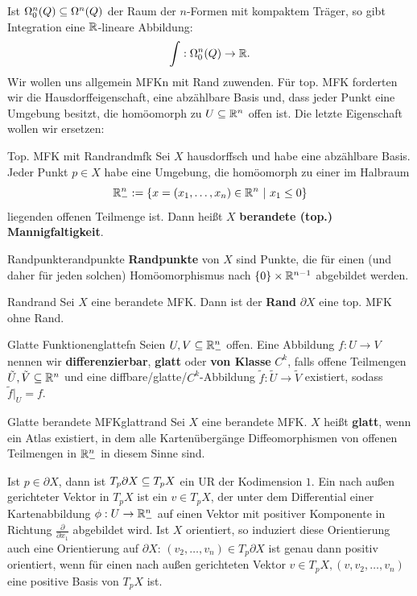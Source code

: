 Ist $\Omega^n_0 (Q) \subseteq \Omega^n (Q)$ der Raum der $n$-Formen mit kompaktem Träger, so gibt Integration eine $\mathbb{R}$-lineare Abbildung:
\begin{equation}
\int : \Omega_0^n (Q) \to \mathbb{R}.
\end{equation}
Wir wollen uns allgemein MFKn mit Rand zuwenden. Für top. MFK forderten wir die Hausdorffeigenschaft, eine abzählbare Basis und, dass jeder Punkt eine Umgebung besitzt, die homöomorph zu $U \subseteq \mathbb{R}^n$ offen ist. Die letzte Eigenschaft wollen wir ersetzen:
\begin{definition}{Top. MFK mit Rand}{randmfk}
Sei $X$ hausdorffsch und habe eine abzählbare Basis. Jeder Punkt $p \in X$ habe eine Umgebung, die homöomorph zu einer im Halbraum 
\begin{equation}
\R_-^n := \{ x=(x_1, \dots, x_n) \in \R^n \ | \ x_1 \leq 0\}
\end{equation}
liegenden offenen Teilmenge ist. Dann heißt $X$ \textbf{berandete (top.) Mannigfaltigkeit}.
\end{definition}
\begin{definition}{Randpunkte}{randpunkte}
\textbf{Randpunkte} von $X$ sind Punkte, die für einen (und daher für jeden solchen) Homöomorphismus nach $\{0\} \times \mathbb{R}^{n-1}$ abgebildet werden.
\end{definition}
\begin{definition}{Rand}{rand}
Sei $X$ eine berandete MFK. Dann ist der \textbf{Rand} $\partial X$ eine top. MFK ohne Rand.
\end{definition}
\begin{definition}{Glatte Funktionen}{glattefn}
Seien $U, V \subseteq \mathbb{R}^n_-$ offen. Eine Abbildung $f: U \to V$ nennen wir \textbf{differenzierbar}, \textbf{glatt} oder \textbf{von Klasse} $C^k$, falls offene Teilmengen $\tilde{U}, \tilde{V} \subseteq \mathbb{R}^n$ und eine diffbare/glatte/$C^k$-Abbildung $\tilde{f}: \tilde{U} \to \tilde{V}$ existiert, sodass $\tilde{f}|_U = f$.
\end{definition}
\begin{definition}{Glatte berandete MFK}{glattrand}
Sei $X$ eine berandete MFK. $X$ heißt \textbf{glatt}, wenn ein Atlas existiert, in dem alle Kartenübergänge Diffeomorphismen von offenen Teilmengen in $\mathbb{R}_-^n$ in diesem Sinne sind.
\end{definition}
Ist $p \in \partial X$, dann ist $T_p \partial X \subseteq T_p X$ ein UR der Kodimension $1$. Ein nach außen gerichteter Vektor in $T_pX$ ist ein $v \in T_pX$, der unter dem Differential einer Kartenabbildung $\phi: U \to \mathbb{R}_-^n$ auf einen Vektor mit positiver Komponente in Richtung $\frac{\partial}{\partial x_1}$ abgebildet wird. Ist $X$ orientiert, so induziert diese Orientierung auch eine Orientierung auf $\partial X$: $(v_2, \dots, v_n) \in T_p \partial X$ ist genau dann positiv orientiert, wenn für einen nach außen gerichteten Vektor $v \in T_pX, (v, v_2, \dots, v_n)$ eine positive Basis von $T_pX$ ist. 

